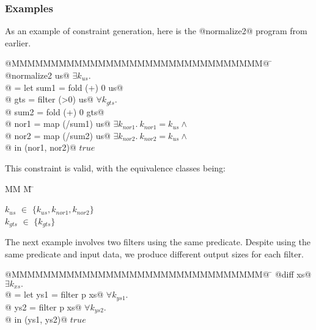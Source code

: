 \begin{figure*}

\end{figure*}

\subsubsection{Examples}
As an example of constraint generation, here is the @normalize2@ program from earlier.
\begin{tabbing}
@MMMMMMMMMMMMMMMMMMMMMMMMMMMMMMMM@  \= \kill
@normalize2 us@                     \> $\exists k_{us}.$      \\
@ = let sum1 = fold   (+) 0 us@     \>                      \\
@       gts  = filter (>0)  us@     \> $\forall k_{gts}.$ \\
@       sum2 = fold   (+) 0 gts@    \> \\
@       nor1 = map  (/sum1) us@     \> $\exists k_{nor1}.\ k_{nor1} = k_{us} \wedge$ \\
@       nor2 = map  (/sum2) us@     \> $\exists k_{nor2}.\ k_{nor2} = k_{us} \wedge$ \\
@   in (nor1, nor2)@                \> $true$ \\
\end{tabbing}
This constraint is valid, with the equivalence classes being:
\newcommand{\eqclasses}[1]{
    \begin{tabbing}
        MM \= M \= \kill
        #1
    \end{tabbing}}
\newcommand{\eqclass}[2]{$#1$ \> $\in$ \> $\{#2\}$ \\}
\eqclasses{
    \eqclass{k_{us}}{k_{us}, k_{nor1}, k_{nor2}}
    \eqclass{k_{gts}}{k_{gts}}
}

The next example involves two filters using the same predicate.
Despite using the same predicate and input data, we produce different output sizes for each filter.
\begin{tabbing}
@MMMMMMMMMMMMMMMMMMMMMMMMMMMMMMMM@  \= \kill
@diff xs@                           \> $\exists k_{xs}.$ \\
@ = let ys1 = filter p xs@          \> $\forall k_{ys1}.$       \\
@       ys2 = filter p xs@          \> $\forall k_{ys2}.$       \\
@   in (ys1, ys2)@                  \> $true$                   \\
\end{tabbing}

